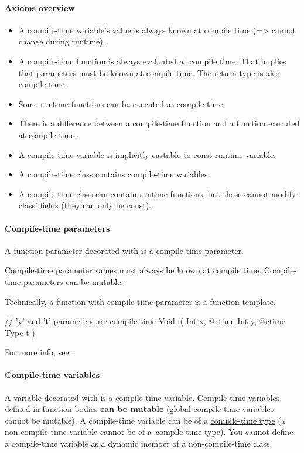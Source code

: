 \paragraph{Axioms overview}
\begin{itemize}
	\item A compile-time variable's value is always known at compile time (=> cannot change during runtime).
	\item A compile-time function is always evaluated at compile time. That implies that parameters must be known at compile time. The return type is also compile-time.
	\item Some runtime functions can be executed at compile time.
	\item There is a difference between a compile-time function and a function executed at compile time.
	\item A compile-time variable is implicitly castable to const runtime variable.
	\item A compile-time class contains compile-time variables.
	\item A compile-time class can contain runtime functions, but those cannot modify class' fields (they can only be const).
\end{itemize}

\paragraph{Compile-time parameters}
A function parameter decorated with  is a compile-time parameter.

Compile-time parameter values must always be known at compile time. Compile-time parameters can be mutable.

Technically, a function with compile-time parameter is a function template.

\begin{code}
// 'y' and 't' parameters are compile-time
Void f( Int x, @ctime Int y, @ctime Type t ) {
	
}
\end{code}

For more info, see .

\paragraph{Compile-time variables}
A variable decorated with  is a compile-time variable. Compile-time variables defined in function bodies \textbf{can be mutable} (global compile-time variables cannot be mutable). A compile-time variable can be of a \hyperref[ctime:class]{compile-time type} (a non-compile-time variable cannot be of a~compile-time type). You cannot define a compile-time variable as a dynamic member of a non-compile-time class.

